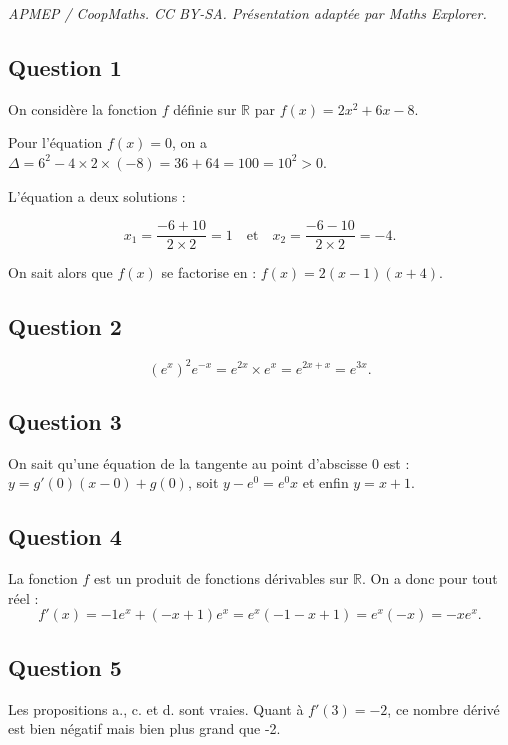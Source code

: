 \documentclass[10pt]{article}
\begin{document}
\noindent\textit{APMEP / CoopMaths. CC BY-SA. Présentation adaptée par Maths Explorer.}\par\medskip
\subsection*{Question 1}
	
	On considère la fonction \(f\) définie sur \(\mathbb{R}\) par \(f(x) = 2x^2 + 6x - 8\).
	
	Pour l’équation \(f(x) = 0\), on a \(\Delta = 6^2 - 4 \times 2 \times (-8) = 36 + 64 = 100 = 10^2 > 0\).
	
	L’équation a deux solutions :
	
	\[
	x_1 = \dfrac{-6 + 10}{2 \times 2} = 1 \quad \text{et} \quad x_2 = \dfrac{-6 - 10}{2 \times 2} = -4.
	\]
	
	On sait alors que \(f(x)\) se factorise en : \(f(x) = 2(x - 1)(x + 4)\).
	
	\subsection*{Question 2}
	
	\[
	\left( e^x \right)^2 e^{-x} = e^{2x} \times e^x = e^{2x + x} = e^{3x}.
	\]
	
	\subsection*{Question 3}
	
	On sait qu’une équation de la tangente au point d’abscisse 0 est :\\
$y =  g'(0)(x - 0)+g(0)$,  soit $ y - e^0 = e^0 x$  et enfin  $y = x + 1$.
	
	
	\subsection*{Question 4}
	
	La fonction \(f\) est un produit de fonctions dérivables sur \(\mathbb{R}\). On a donc pour tout réel :
	\[
	f'(x) = -1 e^x + (-x + 1) e^x = e^x (-1 - x + 1) = e^x (-x) = -x e^x.
	\]
	
	\subsection*{Question 5}
	
	Les propositions a., c. et d. sont vraies. Quant à \(f'(3) = -2\), ce nombre dérivé est bien négatif mais bien plus grand que -2.
\end{document}
